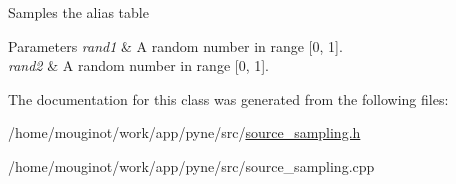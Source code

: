 Samples the alias table 
\begin{DoxyParams}{Parameters}
{\em rand1} & A random number in range \mbox{[}0, 1\mbox{]}. \\
\hline
{\em rand2} & A random number in range \mbox{[}0, 1\mbox{]}. \\
\hline
\end{DoxyParams}


The documentation for this class was generated from the following files\+:\begin{DoxyCompactItemize}
\item 
/home/mouginot/work/app/pyne/src/\hyperlink{source__sampling_8h}{source\+\_\+sampling.\+h}\item 
/home/mouginot/work/app/pyne/src/source\+\_\+sampling.\+cpp\end{DoxyCompactItemize}
